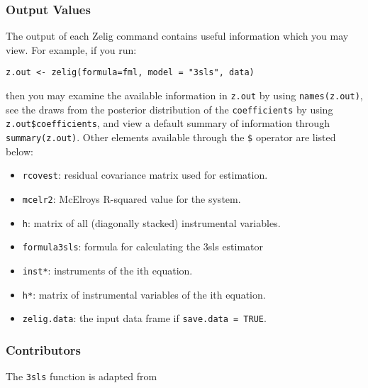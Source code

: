 \subsubsection{Output Values}
The output of each Zelig command contains useful information which you may
view. For example, if you run:
\begin{verbatim}
z.out <- zelig(formula=fml, model = "3sls", data)
\end{verbatim}
\noindent then you may examine the available information in \texttt{z.out} by
using \texttt{names(z.out)}, see the draws from the posterior distribution of
the \texttt{coefficients} by using \texttt{z.out\$coefficients}, and view a default
summary of information through \texttt{summary(z.out)}. Other elements
available through the \texttt{\$} operator are listed below:
\begin{itemize}
\item \texttt{rcovest}: residual covariance matrix used for estimation.
\item \texttt{mcelr2}: McElroys R-squared value for the system.
\item \texttt{h}: matrix of all (diagonally stacked) instrumental variables.
\item \texttt{formula3sls}: formula for calculating the 3sls estimator 

\end{itemize}

\begin{itemize}
\item \texttt{inst*}: instruments of the ith equation.
\item \texttt{h*}: matrix of instrumental variables of the ith equation. 
   \item {\tt zelig.data}: the input data frame if {\tt save.data = TRUE}.  
\end{itemize}
\subsubsection{Contributors}
The \texttt{3sls} function is adapted from 


